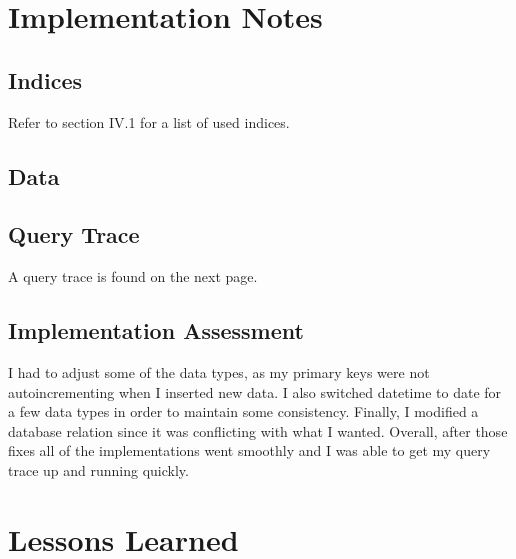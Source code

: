\documentclass[11pt]{report}
\begin{document}
\chapter{Implementation Notes}
\section{Indices}
Refer to section IV.1 for a list of used indices.
\section{Data}

\section{Query Trace}
A query trace is found on the next page.

\section{Implementation Assessment}
I had to adjust some of the data types, as my primary keys were not autoincrementing when I inserted new data. I also switched datetime to date for a few data types in order to maintain some consistency. Finally, I modified a database relation since it was conflicting with what I wanted. Overall, after those fixes all of the implementations went smoothly and I was able to get my query trace up and running quickly.
\chapter{Lessons Learned}
\end{document}
